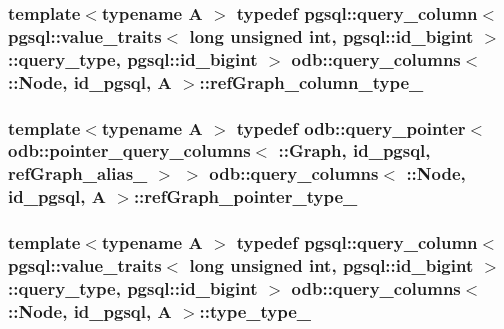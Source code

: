 \subsubsection[{ref\+Graph\+\_\+column\+\_\+type\+\_\+}]{\setlength{\rightskip}{0pt plus 5cm}template$<$typename A $>$ typedef pgsql\+::query\+\_\+column$<$ pgsql\+::value\+\_\+traits$<$ long unsigned int, pgsql\+::id\+\_\+bigint $>$\+::query\+\_\+type, pgsql\+::id\+\_\+bigint $>$ odb\+::query\+\_\+columns$<$ \+::{\bf Node}, id\+\_\+pgsql, A $>$\+::{\bf ref\+Graph\+\_\+column\+\_\+type\+\_\+}}\label{structodb_1_1query__columns_3_01_1_1_node_00_01id__pgsql_00_01_a_01_4_a194b9a9f3e09f3fbfada9a59bc80ade3}
\hypertarget{structodb_1_1query__columns_3_01_1_1_node_00_01id__pgsql_00_01_a_01_4_aeee67984aa1be1821a4cd152bb3a86cf}{}
\subsubsection[{ref\+Graph\+\_\+pointer\+\_\+type\+\_\+}]{\setlength{\rightskip}{0pt plus 5cm}template$<$typename A $>$ typedef odb\+::query\+\_\+pointer$<$ odb\+::pointer\+\_\+query\+\_\+columns$<$ \+::{\bf Graph}, id\+\_\+pgsql, {\bf ref\+Graph\+\_\+alias\+\_\+} $>$ $>$ odb\+::query\+\_\+columns$<$ \+::{\bf Node}, id\+\_\+pgsql, A $>$\+::{\bf ref\+Graph\+\_\+pointer\+\_\+type\+\_\+}}\label{structodb_1_1query__columns_3_01_1_1_node_00_01id__pgsql_00_01_a_01_4_aeee67984aa1be1821a4cd152bb3a86cf}
\hypertarget{structodb_1_1query__columns_3_01_1_1_node_00_01id__pgsql_00_01_a_01_4_a60d79748387e6b960bfc9af6d5c367f6}{}
\subsubsection[{type\+\_\+type\+\_\+}]{\setlength{\rightskip}{0pt plus 5cm}template$<$typename A $>$ typedef pgsql\+::query\+\_\+column$<$ pgsql\+::value\+\_\+traits$<$ long unsigned int, pgsql\+::id\+\_\+bigint $>$\+::query\+\_\+type, pgsql\+::id\+\_\+bigint $>$ odb\+::query\+\_\+columns$<$ \+::{\bf Node}, id\+\_\+pgsql, A $>$\+::{\bf type\+\_\+type\+\_\+}}\label{structodb_1_1query__columns_3_01_1_1_node_00_01id__pgsql_00_01_a_01_4_a60d79748387e6b960bfc9af6d5c367f6}


